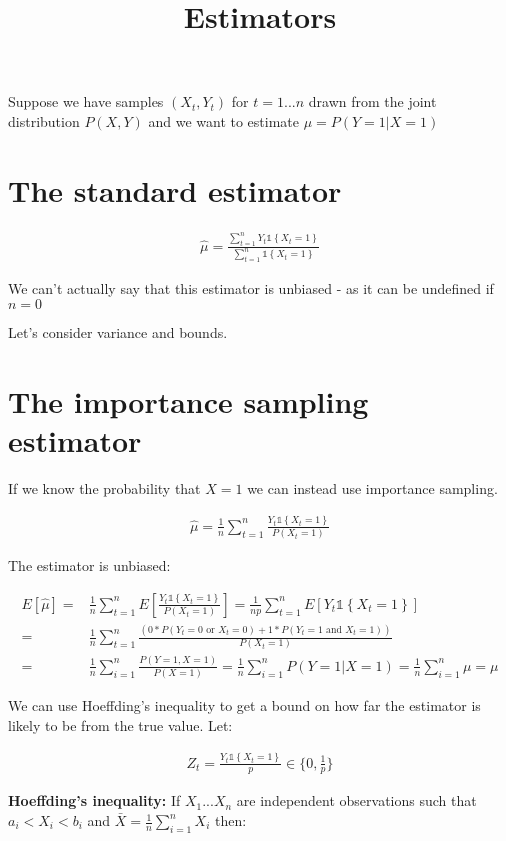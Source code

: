 \documentclass{article}
\title{Estimators}
\newcommand{\set}[1]{\left\{#1\right\}}
\newcommand{\ind}[1]{\mathds{1}\!\!\set{#1}}
\newcommand{\eqn}[1]{\begin{align}#1\end{align}}
\theoremstyle{plain}
\theoremstyle{definition}
\begin{document}
\def\ci{\perp\!\!\!\perp}
\maketitle


Suppose we have samples $(X_t,Y_t)$ for $t = 1... n$ drawn from the joint distribution $P(X,Y)$ and we want to estimate $\mu = P(Y=1|X=1)$ 

\section{The standard estimator}

\eqn{
\hat{\mu} = \frac{\sum_{t=1}^n Y_t \ind{X_t=1}}{\sum_{t=1}^n\ind{X_t=1}}
}

We can't actually say that this estimator is unbiased - as it can be undefined if $n = 0$

\color{red}{Is there an unbiased estimator for this simple problem if the $P(X = 1)$ is not known?}\color{black}

Let's consider variance and bounds.



\section{The importance sampling estimator}
If we know the probability that $X=1$ we can instead use importance sampling.

\eqn{
\hat{\mu} = \frac{1}{n}\sum_{t=1}^n\frac{Y_t \ind{X_t=1}}{P(X_t=1)}
}

The estimator is unbiased:

\eqn{
E[\hat{\mu}] = &\frac{1}{n}\sum_{t=1}^n E\left[\frac{Y_t \ind{X_t=1}}{P(X_t=1)}\right] = \frac{1}{np}\sum_{t=1}^n E\left[Y_t \ind{X_t=1}\right] \\
= & \frac{1}{n} \sum_{t=1}^n \frac{\left( 0*P(Y_t=0 \text{ or } X_t=0) + 1*P(Y_t = 1 \text{ and } X_t=1) \right)}{P(X_t=1)} \\
= & \frac{1}{n}\sum_{i=1}^n\frac{P(Y=1,X=1)}{P(X=1)} = \frac{1}{n}\sum_{i=1}^{n}P(Y=1|X=1) = \frac{1}{n} \sum_{i=1}^n \mu = \mu
}

We can use Hoeffding's inequality to get a bound on how far the estimator is likely to be from the true value. Let:

\eqn{
Z_t = \frac{Y_t \ind{X_t=1}}{p} \in \{0,\frac{1}{p}\}
}

\textbf{Hoeffding's inequality:} If $X_1...X_n$ are independent observations such that $a_i < X_i < b_i$ and $\bar{X} = \frac{1}{n}\sum_{i=1}^n X_i$ then:
\end{document}
